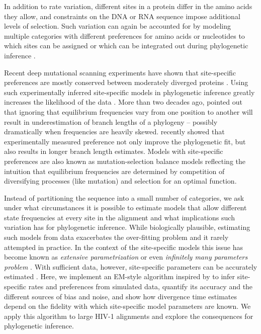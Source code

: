 \documentclass[aps,rmp,twocolumn,linenumbers]{revtex4-1}
\begin{document}
In addition to rate variation, different sites in a protein differ in the amino acids they allow, and constraints on the DNA or RNA sequence impose additional levels of selection.
Such variation can again be accounted for by modeling multiple categories with different preferences for amino acids or nucleotides to which sites can be assigned or which can be integrated out during phylogenetic inference \citep{Lartillot01062004,kainer_effects_2015,shapiro_choosing_2006}.

Recent deep mutational scanning experiments have shown that site-specific preferences are mostly conserved between moderately diverged proteins \citep{doud_site-specific_2015}.
Using such experimentally inferred site-specific models in phylogenetic inference greatly increases the likelihood of the data \cite{bloom2014experimentally}.
More than two decades ago, \citet{halpern_evolutionary_1998} pointed out that ignoring that equilibrium frequencies vary from one position to another will result in underestimation of branch lengths of a phylogeny -- possibly dramatically when frequencies are heavily skewed.
\citet{hilton_modeling_2018} recently showed that experimentally measured preference not only improve the phylogenetic fit, but also results in longer branch length estimates.
Models with site-specific preferences are also known as mutation-selection balance models \citep{bruno1996modeling,yang2008mutation} reflecting the intuition that equilibrium frequencies are determined by competition of diversifying processes (like mutation) and selection for an optimal function.

Instead of partitioning the sequence into a small number of categories, we ask under what circumstances it is possible to estimate models that allow different state frequencies at every site in the alignment and what implications such variation has for phylogenetic inference.
While biologically plausible, estimating such models from data exacerbates the over-fitting problem and it rarely attempted in practice.
In the context of the site-specific models this issue has become known as {\em extensive parametrization} or even {\em infinitely many parameters problem} \cite{Rodrigue557,spielman2016extensively}.
With sufficient data, however, site-specific parameters can be accurately estimated \citep{tamuri_estimating_2012,spielman2016extensively,scheffler2014validity}.
Here, we implement an EM-style algorithm inspired by \citep{bruno1996modeling} to infer site-specific rates and preferences from simulated data, quantify its accuracy and the different sources of bias and noise, and show how divergence time estimates depend on the fidelity with which site-specific model parameters are known.
We apply this algorithm to large HIV-1 alignments and explore the consequences for phylogenetic inference.
\end{document}

